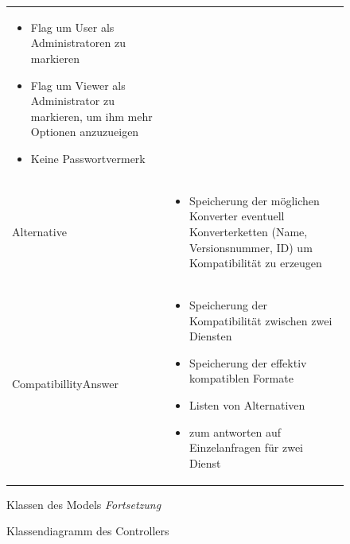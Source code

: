 \begin{figure}[h]
\begin{tabularx}{\textwidth}{p{} | X}
\begin{itemize}
			\item Flag um User als Administratoren zu markieren
			\item Flag um Viewer als Administrator zu markieren, um ihm mehr Optionen anzuzueigen
			\item Keine Passwortvermerk
		\end{itemize}\\
		Alternative & \begin{itemize}
			\item Speicherung der möglichen Konverter eventuell Konverterketten (Name, Versionsnummer, ID) um Kompatibilität zu erzeugen
		\end{itemize}\\
		\rowcolor[HTML]{E7E7E7}
		CompatibillityAnswer & \begin{itemize}
			\item Speicherung der Kompatibilität zwischen zwei Diensten
			\item Speicherung der effektiv kompatiblen Formate
			\item Listen von Alternativen
			\item zum antworten auf Einzelanfragen für zwei Dienst
		\end{itemize}\\
	\end{tabularx}
	\caption{Klassen des Models \textit{Fortsetzung}}
\end{figure}



\begin{figure}[h]
	\centering
	\caption{Klassendiagramm des Controllers}
	\label{fig:klassendiagramm-a}
\end{figure}

